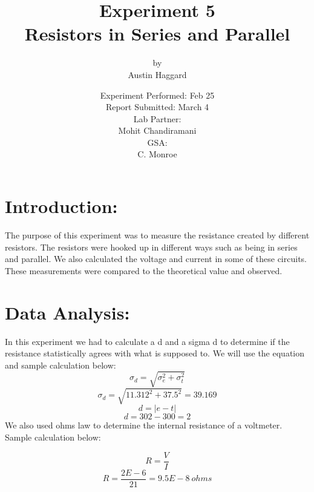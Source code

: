 \documentclass{article}
\title{Experiment 5 \\ Resistors in Series and Parallel}
\author{by \\ Austin Haggard}
\date{
	Experiment Performed: Feb 25 \\
	Report Submitted: March 4 \\[11pt]
	Lab Partner: \\ Mohit Chandiramani \\[11pt] 
	GSA: \\ C. Monroe
}
\begin{document}
\maketitle
\thispagestyle{empty}
\newpage

\section*{Introduction:}
\setcounter{page}{1}
The purpose of this experiment was to measure the resistance created by different resistors.  The resistors were hooked up in different ways such as being in series and parallel.  We also calculated the voltage and current in some of these circuits.  These measurements were compared to the theoretical value and observed.  
\newpage


\section*{Data Analysis:}
\setcounter{page}{3}
	In this experiment we had to calculate a d and a sigma d to determine if the resistance statistically agrees with what is supposed to.  We will use the equation and sample calculation below:
	\[\sigma_d = \sqrt{\sigma_e^2 + \sigma_t^2}\]
	\[\sigma_d = \sqrt{11.312^2 + 37.5^2} = 39.169\]
	\[d = |e - t|\]
	\[d = 302 - 300 = 2\]
	We also used ohms law to determine the internal resistance of a voltmeter.  Sample calculation below:
	
	\[R = \frac{V}{I}\]
	\[R = \frac{2E-6}{21} = 9.5E-8\ ohms\]
	
	
\newpage
\end{document}
